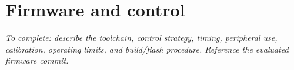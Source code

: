 \section{Firmware and control}
\textit{To complete: describe the toolchain, control strategy, timing, peripheral use, calibration, operating limits, and build/flash procedure. Reference the evaluated firmware commit.}
